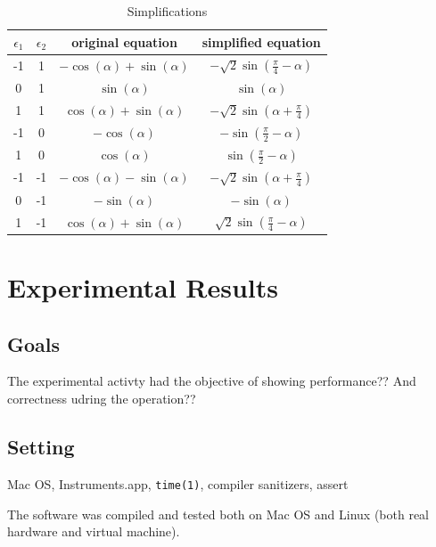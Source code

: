 \documentclass{article}
\begin{document}
\begin{table}
\centering
\begin{tabular}{c c | c | c}
$\epsilon_1$ & $\epsilon_2$ & original equation & simplified equation\\
\hline
-1 & 1 & $-\cos(\alpha)+\sin(\alpha)$ & $-\sqrt{2}\sin(\frac{\pi}{4}-\alpha)$\\
0 & 1 & $\sin(\alpha)$ & $\sin(\alpha)$\\
1 & 1 & $\cos(\alpha) + \sin(\alpha)$ & $-\sqrt{2}\sin(\alpha+\frac{\pi}{4})$\\
-1 & 0 & $-\cos(\alpha)$ & $-\sin(\frac{\pi}{2}-\alpha)$\\
1 & 0 & $\cos(\alpha)$ & $\sin(\frac{\pi}{2}-\alpha)$\\
-1 & -1 & $-\cos(\alpha)-\sin(\alpha)$ & $-\sqrt{2}\sin(\alpha+\frac{\pi}{4})$\\
0 & -1 & $-\sin(\alpha)$ & $-\sin(\alpha)$\\
1 & -1 & $\cos(\alpha) + \sin(\alpha)$ & $\sqrt{2}\sin(\frac{\pi}{4}-\alpha)$\\
\end{tabular}
\caption{Simplifications}
\label{tab:simplifications}
\end{table}

\section{Experimental Results}\label{sec:experimental_results}


\subsection{Goals}\label{sec:goals}

The experimental activty had the objective of showing performance?? And
correctness udring the operation??

\subsection{Setting}\label{sec:setting}

Mac OS, Instruments.app, \texttt{time(1)}, compiler sanitizers, assert

The software was compiled and tested both on Mac OS and Linux (both real
hardware and virtual machine).
\end{document}
